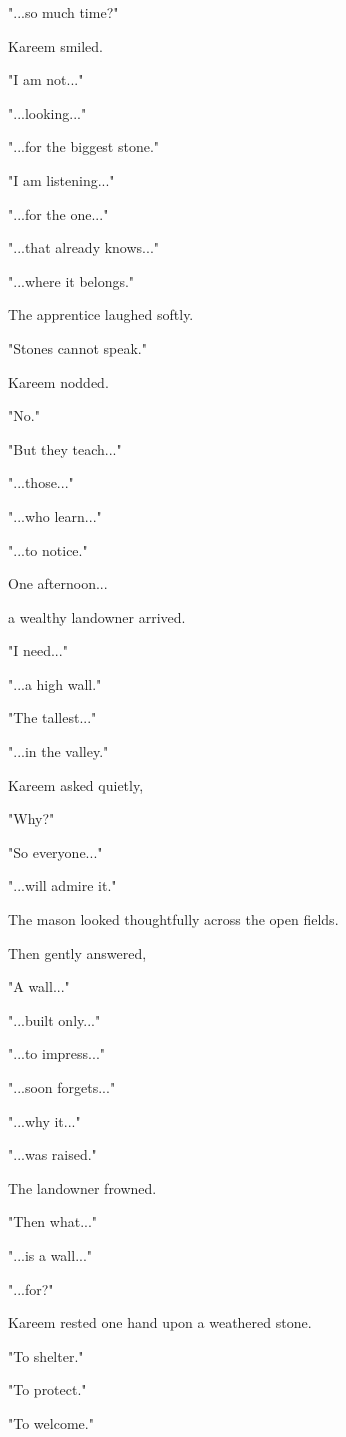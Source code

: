 \documentclass[12pt,openany]{book}
\begin{document}
"...so much time?"

Kareem smiled.

"I am not..."

"...looking..."

"...for the biggest stone."

"I am listening..."

"...for the one..."

"...that already knows..."

"...where it belongs."

The apprentice laughed softly.

"Stones cannot speak."

Kareem nodded.

"No."

"But they teach..."

"...those..."

"...who learn..."

"...to notice."

One afternoon...

a wealthy landowner arrived.

"I need..."

"...a high wall."

"The tallest..."

"...in the valley."

Kareem asked quietly,

"Why?"

"So everyone..."

"...will admire it."

The mason looked thoughtfully across the open fields.

Then gently answered,

"A wall..."

"...built only..."

"...to impress..."

"...soon forgets..."

"...why it..."

"...was raised."

The landowner frowned.

"Then what..."

"...is a wall..."

"...for?"

Kareem rested one hand upon a weathered stone.

"To shelter."

"To protect."

"To welcome."
\end{document}
